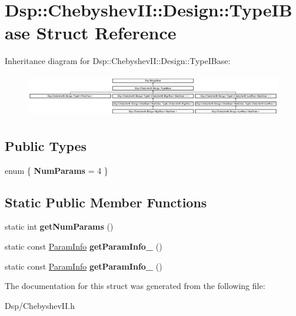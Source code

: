 \hypertarget{structDsp_1_1ChebyshevII_1_1Design_1_1TypeIBase}{\section{Dsp\-:\-:Chebyshev\-I\-I\-:\-:Design\-:\-:Type\-I\-Base Struct Reference}
\label{structDsp_1_1ChebyshevII_1_1Design_1_1TypeIBase}
}
Inheritance diagram for Dsp\-:\-:Chebyshev\-I\-I\-:\-:Design\-:\-:Type\-I\-Base\-:\begin{figure}[H]
\begin{center}
\leavevmode
\includegraphics[height=1.900883cm]{structDsp_1_1ChebyshevII_1_1Design_1_1TypeIBase}
\end{center}
\end{figure}
\subsection*{Public Types}
\begin{DoxyCompactItemize}
\item 
enum \{ {\bfseries Num\-Params} =  4
 \}
\end{DoxyCompactItemize}
\subsection*{Static Public Member Functions}
\begin{DoxyCompactItemize}
\item 
\hypertarget{structDsp_1_1ChebyshevII_1_1Design_1_1TypeIBase_ab6518ca0445f2c700be0873f90f59e9c}{static int {\bfseries get\-Num\-Params} ()}\label{structDsp_1_1ChebyshevII_1_1Design_1_1TypeIBase_ab6518ca0445f2c700be0873f90f59e9c}

\item 
\hypertarget{structDsp_1_1ChebyshevII_1_1Design_1_1TypeIBase_a1dcda24b7cda5ee3d7a5528eed62933f}{static const \hyperlink{classDsp_1_1ParamInfo}{Param\-Info} {\bfseries get\-Param\-Info\-\_} ()}\label{structDsp_1_1ChebyshevII_1_1Design_1_1TypeIBase_a1dcda24b7cda5ee3d7a5528eed62933f}

\item 
\hypertarget{structDsp_1_1ChebyshevII_1_1Design_1_1TypeIBase_a62c81351a7b35c91aa8239b4760eb9b1}{static const \hyperlink{classDsp_1_1ParamInfo}{Param\-Info} {\bfseries get\-Param\-Info\-\_} ()}\label{structDsp_1_1ChebyshevII_1_1Design_1_1TypeIBase_a62c81351a7b35c91aa8239b4760eb9b1}

\end{DoxyCompactItemize}


The documentation for this struct was generated from the following file\-:\begin{DoxyCompactItemize}
\item 
Dsp/Chebyshev\-I\-I.\-h\end{DoxyCompactItemize}
